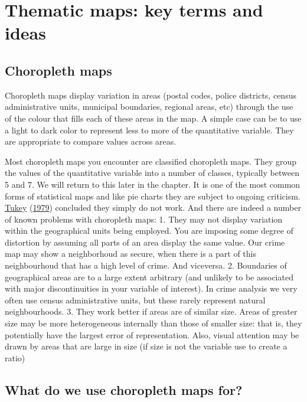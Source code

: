 \documentclass[
]{book}
\begin{document}
\hypertarget{thematic-maps-key-terms-and-ideas}{%
\section{Thematic maps: key terms and ideas}\label{thematic-maps-key-terms-and-ideas}}

\hypertarget{choropleth-maps}{%
\subsection{Choropleth maps}\label{choropleth-maps}}

Choropleth maps display variation in areas (postal codes, police districts, census administrative units, municipal boundaries, regional areas, etc) through the use of the colour that fills each of these areas in the map. A simple case can be to use a light to dark color to represent less to more of the quantitative variable. They are appropriate to compare values across areas.

Most choropleth maps you encounter are classified choropleth maps. They group the values of the quantitative variable into a number of classes, typically between 5 and 7. We will return to this later in the chapter. It is one of the most common forms of statistical maps and like pie charts they are subject to ongoing criticism. \protect\hyperlink{ref-Tukey_1979}{Tukey} (\protect\hyperlink{ref-Tukey_1979}{1979}) concluded they simply do not work. And there are indeed a number of known problems with choropleth maps:
1. They may not display variation within the geographical units being employed. You are imposing some degree of distortion by assuming all parts of an area display the same value. Our crime map may show a neighborhoud as secure, when there is a part of this neighbourhoud that has a high level of crime. And viceversa.
2. Boundaries of geographical areas are to a large extent arbitrary (and unlikely to be associated with major discontinuities in your variable of interest). In crime analysis we very often use census administrative units, but these rarely represent natural neighbourhoods.
3. They work better if areas are of similar size. Areas of greater size may be more heterogeneous internally than those of smaller size: that is, they potentially have the largest error of representation. Also, visual attention may be drawn by areas that are large in size (if size is not the variable use to create a ratio)

\hypertarget{what-do-we-use-choropleth-maps-for}{%
\subsection{What do we use choropleth maps for?}\label{what-do-we-use-choropleth-maps-for}}
\end{document}
